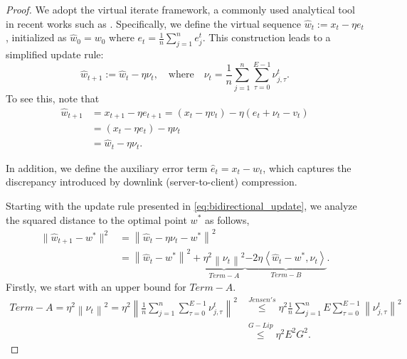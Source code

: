 \documentclass{article} %
\begin{document}
\begin{proof}
    We adopt the virtual iterate framework, a commonly used analytical tool in recent works such as \cite{stich2019error,koloskova2023gradient,mishchenko2023partially,islamov2024asgrad,islamov2025safe}. Specifically, we define the virtual sequence $\hat{w}_t:= x_t - \eta e_t$, initialized as $\hat{w}_0 = w_0$ where $e_t = \frac{1}{n} \sum_{j=1}^n e_j^t$. This construction leads to a simplified update rule: $$\hat{w}_{t+1}:= \hat{w}_t - \eta \nu_t, \quad \text{where} \quad \nu_t =  \frac{1}{n} \sum_{j=1}^n \sum_{\tau=0}^{E-1}\nu_{j,\tau}^t.$$ To see this, note that
    \begin{equation}
    \label{eq:bidirectional_update}
        \begin{aligned}
            \hat{w}_{t+1} &= x_{t+1} - \eta e_{t+1} = (x_t - \eta v_t) - \eta(e_t + \nu_t - v_t) 
            \\
            &= (x_t - \eta e_t) - \eta \nu_t 
            \\
            &= \hat{w}_t - \eta \nu_t.
        \end{aligned}
    \end{equation}
    
    In addition, we define the auxiliary error term $\hat{e}_t = x_t - w_t$, which captures the discrepancy introduced by downlink (server-to-client) compression.

    
    Starting with the update rule presented in \cref{eq:bidirectional_update}, we analyze the squared distance to the optimal point $w^*$ as follows,
    \begin{align}
    \nonumber
    \|\hat{w}_{t+1} - w^*\|^2 
    &= \left\| \hat{w}_t - \eta \nu_t - w^* \right\|^2 \\
    \label{eq:hard_fedbi_start}
    & = \left\| \hat{w}_t - w^* \right\|^2 + \underbrace{\eta^2\left\|\nu_t \right\|^2}_{Term-A} \underbrace{-2 \eta \left \langle\hat{w}_t - w^*,  \nu_t \right \rangle}_{Term-B}.
\end{align}
Firstly, we start with an upper bound for $Term-A$.
\begin{align*}
    Term-A = \eta^2\left\|\nu_t \right\|^2 = \eta^2 \left\| \frac{1}{n} \sum_{j=1}^n  \sum_{\tau=0}^{E-1} \nu_{j,\tau}^t\right\|^2 &\overset{Jensen's}{\leq} \eta^2 \frac{1}{n} \sum_{j=1}^n E \sum_{\tau=0}^{E-1}\left\|  \nu_{j,\tau}^t\right\|^2 
        \\
        & \overset{G-Lip}{\leq} \eta^2 E^2 G^2.
\end{align*}


\end{proof}
\end{document}
